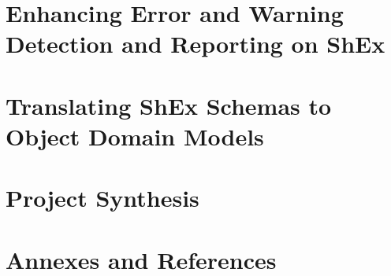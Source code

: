 \documentclass[open=any]{SPhdThesis}
\begin{document}
	\begin{frontmatter}
		\SgAddTitle%
		\SgAddToc%
		\SgAddLof%
		\SgAddLot%
	\end{frontmatter}
   
	
	
	

	\part{Enhancing Error and Warning Detection and Reporting on ShEx}
	
	
	

	\part{Translating ShEx Schemas to Object Domain Models}
	
	
	

	\part{Project Synthesis}
	
	
	

	\part{Annexes and References}
	\begin{appendices}
		
		
		
	\end{appendices}

\end{document}
